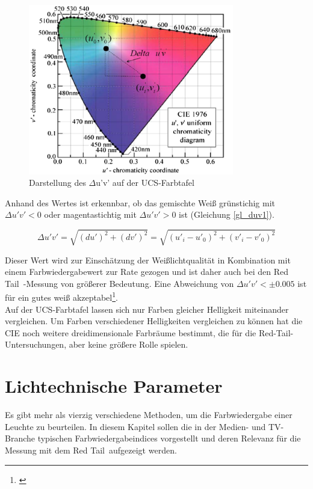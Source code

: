 \begin{figure}[H]     %
\centering
\includegraphics[width=0.8\textwidth]{bilder/duv1} 
\caption {Darstellung des $\Delta$u'v' auf der UCS-Farbtafel}\label{b_duv}
\end{figure}


Anhand des Wertes ist erkennbar, ob das gemischte Weiß grünstichig mit $\Delta u'v' < 0$ oder magentastichtig mit $\Delta u'v' > 0$ ist (Gleichung \ref{gl_duv1}).

\begin{equation}\label{gl_duv1}
		\Delta u'v'=\sqrt{(du')^{2}+(dv')^{2}}=\sqrt{(u'_{i}-u'_{0})^{2}+(v'_{i}-v'_{0})^{2}}
\end{equation}

Dieser Wert wird zur Einschätzung der Weißlichtqualität in Kombination mit einem Farbwiedergabewert zur Rate gezogen und ist daher auch bei den \glqq Red Tail\grqq\ -Messung von größerer Bedeutung. Eine Abweichung von $\Delta u'v' < \pm 0.005$ ist für ein gutes weiß akzeptabel\footnote{\cite{ohno}}.\\

Auf der UCS-Farbtafel lassen sich nur Farben gleicher Helligkeit miteinander vergleichen. Um Farben verschiedener Helligkeiten vergleichen zu können hat die CIE noch weitere dreidimensionale Farbräume bestimmt, die für die Red-Tail-Untersuchungen, aber keine größere Rolle spielen.\newpage


\chapter{Lichtechnische Parameter}
Es gibt mehr als vierzig verschiedene Methoden, um die Farbwiedergabe einer Leuchte zu beurteilen. In diesem Kapitel sollen die in der Medien- und TV-Branche typischen Farbwiedergabeindices vorgestellt und deren Relevanz für die Messung mit dem \glqq Red Tail\grqq\  aufgezeigt werden.

